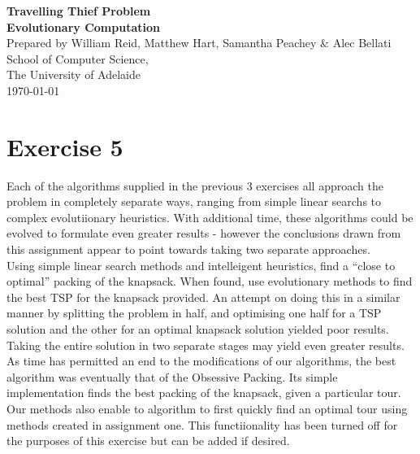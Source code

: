 \documentclass[a4paper,12pt]{article}
\begin{document}
\begin{center}
{\LARGE\bf Travelling Thief Problem}\\
\vspace{0.5cm}
{\Large\bf Evolutionary Computation}\\
\vspace{1cm}
Prepared by William Reid, Matthew Hart, Samantha Peachey \& Alec Bellati\\
\vspace{1cm}
School of Computer Science,\\
The University of Adelaide\\
\vspace{1cm}
\today
\end{center}

\vspace{1cm}
\section*{Exercise 5}
Each of the algorithms supplied in the previous 3 exercises all approach the problem in completely separate ways, ranging from simple linear searchs to complex evolutiionary heuristics. With additional time, these algorithms could be evolved to formulate even greater results - however the conclusions drawn from this assignment appear to point towards taking two separate approaches.\\

Using simple linear search methods and intelleigent heuristics, find a ``close to optimal'' packing of the knapsack. When found, use evolutionary methods to find the best TSP for the knapsack provided. An attempt on doing this in a similar manner by splitting the problem in half, and optimising one half for a TSP solution and the other for an optimal knapsack solution yielded poor results. Taking the entire solution in two separate stages may yield even greater results.\\

As time has permitted an end to the modifications of our algorithms, the best algorithm was eventually that of the Obsessive Packing. Its simple implementation finds the best packing of the knapsack, given a particular tour. Our methods also enable to algorithm to first quickly find an optimal tour using methods created in assignment one. This functiionality has been turned off for the purposes of this exercise but can be added if desired. 

\newpage
\end{document}
